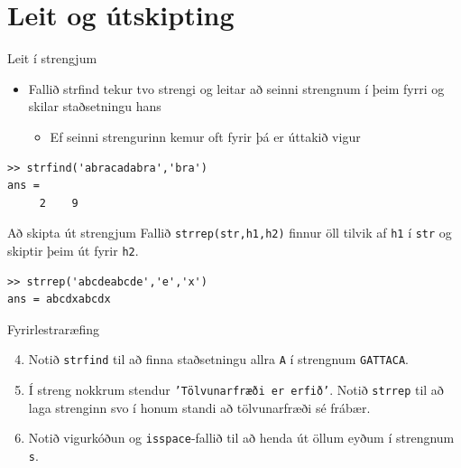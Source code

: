 \documentclass[handout]{beamer}
\begin{document}
\section{Leit og útskipting}

\begin{frame}[fragile]{Leit í strengjum}
\begin{itemize}
 \item Fallið strfind tekur tvo strengi og leitar að seinni strengnum í þeim fyrri og skilar staðsetningu hans
 \begin{itemize}
  \item Ef seinni strengurinn kemur oft fyrir þá er úttakið vigur
 \end{itemize}
\end{itemize}
\begin{verbatim}
>> strfind('abracadabra','bra')
ans =
     2    9
\end{verbatim}
\end{frame}

\begin{frame}[fragile]{Að skipta út strengjum}
Fallið \texttt{strrep(str,h1,h2)} finnur öll tilvik af \texttt{h1} í \texttt{str} og skiptir þeim út fyrir \texttt{h2}.
\begin{verbatim}
>> strrep('abcdeabcde','e','x')
ans = abcdxabcdx
\end{verbatim}
\end{frame}

\begin{frame}{Fyrirlestraræfing}
    \begin{enumerate}
        \setcounter{enumi}{3}
        \item Notið \texttt{strfind} til að finna staðsetningu allra \texttt{A} í strengnum \texttt{GATTACA}.
        \item Í streng nokkrum stendur \texttt{'Tölvunarfræði er erfið'}. Notið \texttt{strrep} til að laga strenginn svo í honum standi að tölvunarfræði sé frábær.
        \item Notið vigurkóðun og \texttt{isspace}-fallið til að henda út öllum eyðum í strengnum \texttt{s}.
    \end{enumerate}
\end{frame}
\end{document}
